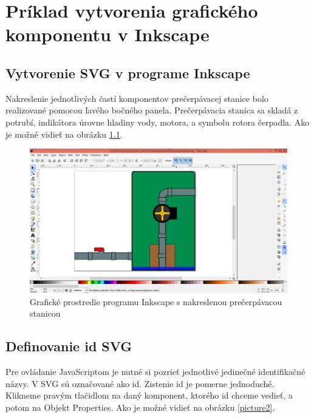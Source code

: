\chapter{Príklad vytvorenia grafického komponentu v Inkscape}

\section{Vytvorenie SVG v programe Inkscape}

Nakreslenie jednotlivých častí komponentov prečerpávacej stanice bolo realizované pomocou ľavého bočného panela. Prečerpávacia stanica sa skladá z potrubí, indikátora úrovne hladiny vody, motora, a symbolu rotora čerpadla. Ako je možné vidieť na obrázku  \ref{picture1}.  



\begin{figure}[hp]
	\begin{center}
		\includegraphics [width=13cm] {obrazky/obr1.png}
		\caption{Grafické prostredie programu Inkscape s nakreslenou prečerpávacou stanicou}
		\label{picture1}
	\end{center}
\end{figure}


\section{Definovanie id SVG}

Pre ovládanie JavaScriptom je nutné si pozrieť jednotlivé jedinečné identifikačné názvy. V SVG sú označované ako id. Zistenie id je pomerne jednoduché. Klikneme pravým tlačidlom na daný komponent, ktorého id chceme vedieť, a potom na Objekt Properties. Ako je možné vidieť na obrázku \ref{picture2}.

